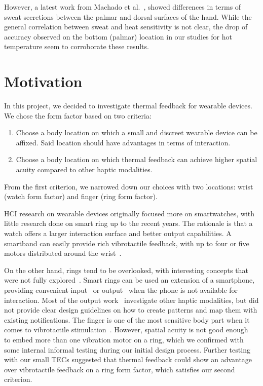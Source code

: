 \documentclass[preprint,12pt]{elsarticle}
\begin{document}
However, a latest work from Machado et al.~\cite{Machado2008}, showed differences in terms of sweat secretions between the palmar and dorsal surfaces of the hand.
While the general correlation between sweat and heat sensitivity is not clear, the drop of accuracy observed on the bottom (palmar) location in our studies for hot temperature seem to corroborate these results.

\section{Motivation}
In this project, we decided to investigate thermal feedback for wearable devices.
We chose the form factor based on two criteria:
\begin{enumerate}
  \item Choose a body location on which a small and discreet wearable device can be affixed. Said location should have advantages in terms of interaction.
  \item Choose a body location on which thermal feedback can achieve higher spatial acuity compared to other haptic modalities.
\end{enumerate}
From the first criterion, we narrowed down our choices with two locations: wrist (watch form factor) and finger (ring form factor).

HCI research on wearable devices originally focused more on smartwatches, with little research done on smart ring up to the recent years.
The rationale is that a watch offers a larger interaction surface and better output capabilities.
A smartband can easily provide rich vibrotactile feedback, with up to four or five motors distributed around the wrist~\cite{2}.

On the other hand, rings tend to be overlooked, with interesting concepts that were not fully explored~\cite{Ringteraction,PairRing,OctaRing}.
Smart rings can be used an extension of a smartphone, providing convenient input~\cite{Ringteraction,PairRing} or output~\cite{24} when the phone is not available for interaction.
Most of the output work~\cite{14,16,24} investigate other haptic modalities, but did not provide clear design guidelines on how to create patterns and map them with existing notifications.
The finger is one of the most sensitive body part when it comes to vibrotactile stimulation~\cite{Gibson}.
However, spatial acuity is not good enough~\cite{Gibson} to embed more than one vibration motor on a ring, which we confirmed with some internal informal testing during our initial design process.
Further testing with our small TECs suggested that thermal feedback could show an advantage over vibrotactile feedback on a ring form factor, which satisfies our second criterion.
\end{document}

